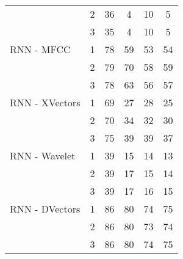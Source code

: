 \documentclass[conference]{IEEEtran}
\begin{document}
\begin{table*}[htbp]
\begin{tabular}{|l|c|c|c|c|c|}
                             & 2             & 36                     & 4                       & 10                   & 5                      \\
                             & 3             & 35                     & 4                       & 10                   & 5                      \\
        RNN - MFCC           & 1             & 78                     & 59                      & 53                   & 54                     \\
                             & 2             & 79                     & 70                      & 58                   & 59                     \\
                             & 3             & 78                     & 63                      & 56                   & 57                     \\
        RNN - XVectors       & 1             & 69                     & 27                      & 28                   & 25                     \\
                             & 2             & 70                     & 34                      & 32                   & 30                     \\
                             & 3             & 75                     & 39                      & 39                   & 37                     \\
        RNN - Wavelet        & 1             & 39                     & 15                      & 14                   & 13                     \\
                             & 2             & 39                     & 17                      & 15                   & 14                     \\
                             & 3             & 39                     & 17                      & 16                   & 15                     \\
        RNN - DVectors       & 1             & 86                     & 80                      & 74                   & 75                     \\
                             & 2             & 86                     & 80                      & 73                   & 74                     \\
                             & 3             & 86                     & 80                      & 74                   & 75                     \\

\end{tabular}
\end{table*}
\end{document}
